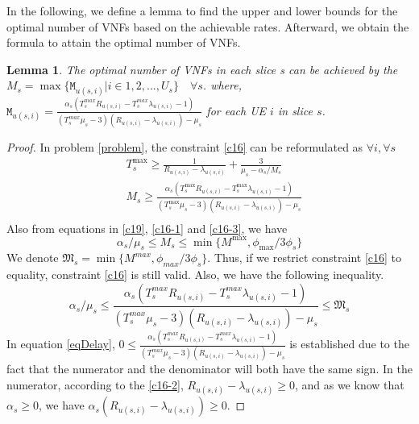 \documentclass[lettersize,journal]{IEEEtran}
\newtheorem{lemma}{Lemma}
\begin{document}
In the following, we define a lemma to find the upper and lower bounds for the optimal number of VNFs based on the achievable rates. Afterward, we obtain the formula to attain the optimal number of VNFs.
\begin{lemma}\label{lemma1}
The optimal number of VNFs in each slice s can be achieved by the
$M_s = \max\{\mathtt{M}_{u(s,i)} | i \in 1,2,..., U_s\} \quad \forall s$.
where, $\mathtt{M}_{u(s,i)} = \frac{\alpha_s(T^{max}_s R_{u(s,i)}-T^{max}_s\lambda_{u(s,i)} -1)}{(T^{max}_s\mu_s-3)(R_{u(s,i)}-\lambda_{u(s,i)}) - \mu_s }$ for each UE $i$ in slice $s$.
\end{lemma}
\begin{proof}
In problem \eqref{problem}, the constraint \eqref{c16} can be reformulated as
$ \forall i,\forall s$
\begin{equation}
\begin{split}
&T^{\max}_s \geq\frac{1}{R_{u(s,i)} - \lambda_{u(s,i)}} + \frac{3}{\mu_s - \alpha_{s}/{M_s}}  \\
&M_s \geq \frac{\alpha_s(T^{\max}_s R_{u(s,i)}-T^{\max}_s\lambda_{u(s,i)} -1)}{(T^{\max}_s\mu_s-3)(R_{u(s,i)}-\lambda_{u(s,i)}) - \mu_s }\\
\end{split}
\end{equation}
Also from equations in \eqref{c19}, \eqref{c16-1} and \eqref{c16-3}, we have
\begin{equation}
\alpha_s/\mu_s\leq M_s \leq \min\{M^{\max}, \phi_{\max}/{3\phi_s}\}
\end{equation}
We denote $ \mathfrak{M}_s= \min\{M^{max}, \phi_{max}/{3\phi_s}\}$.
Thus, if we restrict constraint \eqref{c16} to equality, constraint \eqref{c16} is still valid.
Also, we have the following inequality.
\begin{equation}\label{eqDelay}
\alpha_s/\mu_s\leq \frac{\alpha_s(T^{max}_s R_{u(s,i)}-T^{max}_s\lambda_{u(s,i)} -1)}{(T^{max}_s\mu_s-3)(R_{u(s,i)}-\lambda_{u(s,i)}) - \mu_s } \leq \mathfrak{M}_s
\end{equation}
In equation \eqref{eqDelay}, $0\leq \frac{\alpha_s(T^{max}_s R_{u(s,i)}-T^{max}_s\lambda_{u(s,i)} -1)}{(T^{max}_s\mu_s-3)(R_{u(s,i)}-\lambda_{u(s,i)}) - \mu_s }$ is established due to the fact that
the numerator and the denominator will both have the same sign.
In the numerator, according to the \eqref{c16-2}, $ R_{u(s,i)}-\lambda_{u(s,i)} \geq 0$, and as we know that $\alpha_s \geq 0$, we have $ \alpha_s (R_{u(s,i)}-\lambda_{u(s,i)}) \geq 0 $.

\end{proof}
\end{document}
